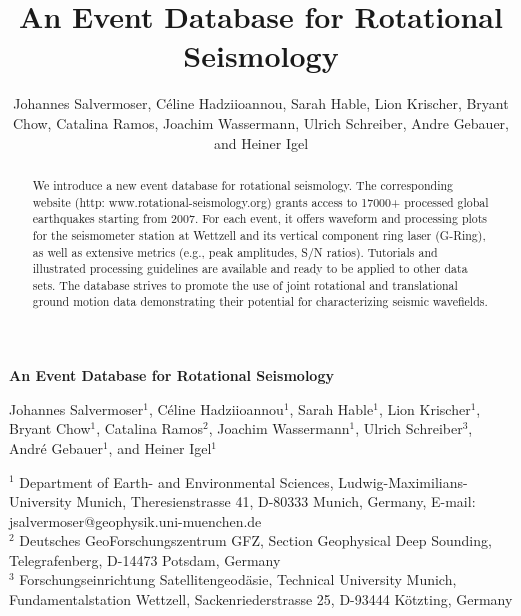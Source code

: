 \documentclass[12pt,reqno,letter]{article}
\begin{document}
% 
\title{An Event Database for Rotational Seismology}

\author{Johannes Salvermoser, C\'{e}line Hadziioannou, Sarah Hable, Lion Krischer, Bryant Chow, Catalina Ramos, Joachim Wassermann, Ulrich Schreiber, Andre Gebauer, and Heiner Igel}

\noindent
\textbf{An Event Database for Rotational Seismology}

\vspace{2em}
\noindent
Johannes Salvermoser$^{1}$, C\'{e}line Hadziioannou$^{1}$, Sarah Hable$^{1}$, Lion Krischer$^{1}$, Bryant Chow$^{1}$, Catalina Ramos$^{2}$, Joachim Wassermann$^{1}$, Ulrich Schreiber$^{3}$, Andr\'{e} Gebauer$^{1}$, and Heiner Igel$^{1}$
\vspace{1em}

\noindent
$^{1}$ Department of Earth- and Environmental Sciences, Ludwig-Maximilians-University Munich, Theresienstrasse 41, D-80333 Munich, Germany, E-mail: jsalvermoser@geophysik.uni-muenchen.de\\
$^{2}$ Deutsches GeoForschungszentrum GFZ, Section Geophysical Deep Sounding, Telegrafenberg, D-14473 Potsdam, Germany\\
$^{3}$ Forschungseinrichtung Satellitengeod{\"a}sie, Technical University Munich, Fundamentalstation Wettzell, Sackenriederstrasse 25, D-93444 K{\"o}tzting, Germany

\begin{abstract}
We introduce a new event database for rotational seismology. The corresponding website (http: www.rotational-seismology.org) grants access to 17000+ processed global earthquakes starting from 2007. For each event, it offers waveform and processing plots for the seismometer station at Wettzell and its vertical component ring laser (G-Ring), as well as extensive metrics (e.g., peak amplitudes, S/N ratios). Tutorials and illustrated processing guidelines are available and ready to be applied to other data sets. The database strives to promote the use of joint rotational and translational ground motion data demonstrating their potential for characterizing seismic wavefields. 
\end{abstract}
% 
% 
\end{document}
